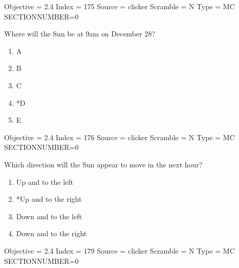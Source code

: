 \documentclass[11pt]{article}
\begin{document}
\begin{enumerate}
\begin{minipage}{\textwidth}
\begin{minipage}{\textwidth}
Objective = 2.4
Index = 175
Source = clicker
Scramble = N
Type = MC
SECTIONNUMBER=0
\end{minipage}
\end{minipage}
\vskip 0.20in

\begin{minipage}{\textwidth}
\begin{minipage}{\textwidth}
\item Where will the Sun be at 9am on December 28?
\begin{multicols}{3}
\begin{enumerate} 
\setlength{\itemsep}{1pt} 
\setlength{\parskip}{0pt} 
\setlength{\parsep}{0pt}
\setlength{\multicolsep}{1pt} 
\item A
\item B
\item C
\item *D
\item E
\end{enumerate} 
\vfill 
\end{multicols}

Objective = 2.4
Index = 176
Source = clicker
Scramble = N
Type = MC
SECTIONNUMBER=0
\end{minipage}
\end{minipage}
\vskip 0.20in

\begin{minipage}{\textwidth}
\begin{minipage}{\textwidth}
\item Which direction will the Sun appear to move in the next hour?
\begin{multicols}{2}
\begin{enumerate} 
\setlength{\itemsep}{1pt} 
\setlength{\parskip}{0pt} 
\setlength{\parsep}{0pt}
\setlength{\multicolsep}{1pt} 
\item Up and to the left
\item *Up and to the right
\item Down and to the left
\item Down and to the right
\end{enumerate} 
\vfill 
\end{multicols}

Objective = 2.4
Index = 179
Source = clicker
Scramble = N
Type = MC
SECTIONNUMBER=0
\end{minipage}
\end{minipage}
\vskip 0.20in


\end{enumerate}
\end{document}
